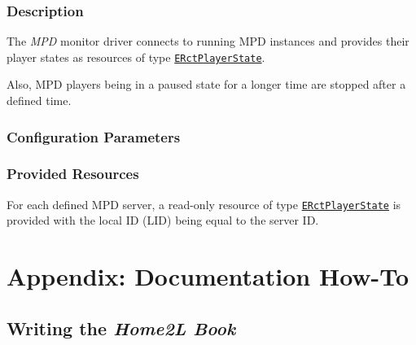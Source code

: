 \documentclass[12pt,english,parskip=half,headheight=19pt]{scrreprt}
\newcommand{\refapic}[1]{\href{home2l-api_c/index.html}{\mbox{\texttt{#1}}}}            %
\begin{document}
\subsection{Description}
\label{sec:drvlib-mpd-description}

The \textit{MPD} monitor driver connects to running MPD instances and provides their player states as resources of type \refapic{ERctPlayerState}.

Also, MPD players being in a paused state for a longer time are stopped after a defined time.



\subsection{Configuration Parameters}
\label{sec:drvlib-mpd-env}



\subsection{Provided Resources}
\label{sec:drvlib-mpd-rc}

For each defined MPD server, a read-only resource of type \refapic{ERctPlayerState} is provided with the local ID (LID) being equal to the server ID.







\appendix





%
\chapter{Appendix: Documentation How-To}
%



\section{Writing the \textit{Home2L Book}}
\label{sec:documenting-the_book}
\end{document}
